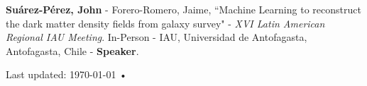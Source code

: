 \documentclass[10pt, a4paper]{article}
\newcommand{\years}[1]{\marginnote{\scriptsize #1}}
\begin{document}
\years{2019}\textbf{Suárez-Pérez, John} - Forero-Romero, Jaime, “Machine Learning to reconstruct the dark matter density fields from galaxy survey" - \emph{XVI Latin American Regional IAU Meeting}. In-Person - IAU, Universidad de Antofagasta, Antofagasta, Chile - \textbf{Speaker}.\\
\fi

\iffalse
\section*{Technologies}
\noindent
\years{2014}\textbf{Suárez, John} - Castillo, Miguel - Salamanca, Julián, “Memcircuit", Software for the study of memristive circutis, \emph{Scientific Software}, 1-2014-64122.\\


\section*{Outreach}
\noindent

\years{2021-2023}\textsc{Member}, \textit{ \href{https://www.astroreca.org/en/committeementors}{ Red de Estudiantes Colombianos de Astronomía - RECA}}  mentorship program committee.  A program focused on guiding students in Colombia who are interested in becoming professional astronomers.\\

\fi



\begin{center}
{\scriptsize  Last updated: \today\- •\- 
}
\end{center}
\end{document}
